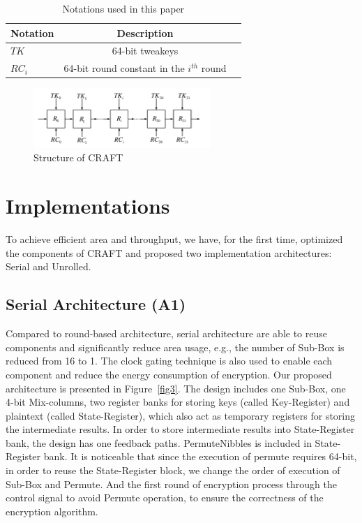 \documentclass[final,5p,times,twocolumn]{elsarticle}
\begin{document}
\begin{table}[h]
    \caption{Notations used in this paper}\label{tab1}%
    \begin{tabular*}{\textwidth}{@{\extracolsep{\fill}}lcc}
        \toprule
        Notation   & Description                                 \\
        \midrule
        $TK$       & 64-bit tweakeys                             \\
        $RC_i$     & 64-bit round constant in the $i^{th}$ round \\
        \bottomrule
    \end{tabular*}
\end{table}

\begin{figure}[h]%
    \centering
    \includegraphics[width=0.6\textwidth]{struct-craft.pdf}
    \caption{Structure of CRAFT}\label{fig1}
\end{figure}

\section{Implementations}\label{sec3}

To achieve efficient area and throughput, we have, for the first time, optimized the components of CRAFT and proposed two implementation architectures: Serial and Unrolled.


\subsection{Serial Architecture (A1)}\label{subsec2}
Compared to round-based architecture, serial architecture are able to reuse components and significantly reduce area usage, e.g., the number of Sub-Box is reduced from 16 to 1.
The clock gating technique is also used to enable each component and reduce the energy consumption of encryption. Our proposed architecture is presented in Figure~\ref{fig3}.
The design includes one Sub-Box, one 4-bit Mix-columns, two register banks for storing keys (called Key-Register) and plaintext (called State-Register), which also act as temporary registers for storing the intermediate results.
In order to store intermediate results into State-Register bank, the design has one feedback paths.
PermuteNibbles is included in State-Register bank.
It is noticeable that since the execution of permute requires 64-bit, in order to reuse the State-Register block, we change the order of execution of Sub-Box and Permute.
And the first round of encryption process through the control signal to avoid Permute operation, to ensure the correctness of the encryption algorithm.
\end{document}
